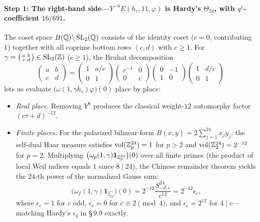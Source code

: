 \paragraph{Step 1: The right-hand side---$Y^{-6}E(h_\tau,11,\varphi)$ is Hardy's $\Theta_{24}$, with $q^1$-coefficient $16/691$.}
The coset space $B(\mathbb{Q})\backslash\operatorname{SL}_2(\mathbb{Q})$ consists of the identity coset ($c=0$, contributing $1$) together with all coprime bottom rows $(c,d)$ with $c\ge 1$. For $\gamma=\bigl(\begin{smallmatrix}a&b\\c&d\end{smallmatrix}\bigr)\in\operatorname{SL}_2(\mathbb{Z})$ ($c\ge 1$), the Bruhat decomposition
\[
\begin{pmatrix}a&b\\c&d\end{pmatrix}
=\begin{pmatrix}1&a/c\\0&1\end{pmatrix}
 \begin{pmatrix}c^{-1}&0\\0&c\end{pmatrix}
 \begin{pmatrix}0&-1\\1&0\end{pmatrix}
 \begin{pmatrix}1&d/c\\0&1\end{pmatrix}
\]
lets us evaluate $\bigl(\omega(1,\gamma h_\tau)\varphi\bigr)(0)$ place by place:
\begin{itemize}
\item \emph{Real place.} Removing $Y^6$ produces the classical weight-$12$ automorphy factor $(c\tau+d)^{-12}$.
\item \emph{Finite places.} For the polarized bilinear form $B(x,y)=2\sum_{j=1}^{24}x_j y_j$, the self-dual Haar measure satisfies $\operatorname{vol}(\mathbb{Z}_p^{24})=1$ for $p>2$ and $\operatorname{vol}(\mathbb{Z}_2^{24})=2^{-12}$ for $p=2$. Multiplying $\bigl(\omega_p(1,\gamma)\mathbf 1_{\mathbb{Z}_p^{24}}\bigr)(0)$ over all finite primes (the product of local Weil indices equals $1$ since $8\mid 24$), the Chinese remainder theorem yields the $24$-th power of the normalized Gauss sum:
\[
\bigl(\omega_f(1,\gamma)\mathbf 1_{\widehat{I_{24}}}\bigr)(0)
=2^{-12}\frac{S_{-d,c}^{24}}{c^{12}}
=2^{-12}\epsilon_c,
\]
where $\epsilon_c=1$ for $c$ odd, $\epsilon_c=0$ for $c\equiv 2\pmod 4$, and $\epsilon_c=2^{12}$ for $4\mid c$---matching Hardy's $\epsilon_q$ in \S\,9.9 exactly.
\end{itemize}
